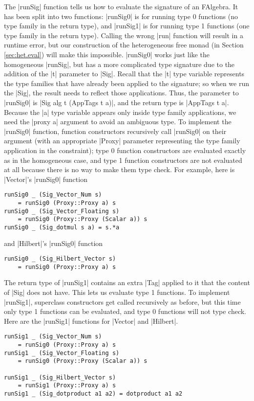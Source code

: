 \documentclass[preprint]{sigplanconf}
\theoremstyle{definition}
\begin{document}
The |runSig| function tells us how to evaluate the signature of an FAlgebra.
It has been split into two functions:
|runSig0| is for running type 0 functions (no type family in the return type),
and |runSig1| is for running type 1 functions (one type family in the return type).
Calling the wrong |run| function will result in a runtime error,
but our construction of the heterogeneous free monad (in Section \ref{sec:het.eval}) will make this impossible.
|runSig0| works just like the homogeneous |runSig|,
but has a more complicated type signature due to the addition of the |t| parameter to |Sig|.
Recall that the |t| type variable represents the type families that have already been applied to the signature;
so when we run the |Sig|, the result needs to reflect those applications.
Thus, the parameter to |runSig0| is |Sig alg t (AppTags t a)|,
and the return type is |AppTags t a|.
Because the |a| type variable appears only inside type family applications,
we need the |proxy a| argument to avoid an ambiguous type.
To implement the |runSig0| function, function constructors recursively call |runSig0| on their argument (with an appropriate |Proxy| parameter representing the type family application in the constraint);
type 0 function constructors are evaluated exactly as in the homogeneous case,
and type 1 function constructors are not evaluated at all because there is no way to make them type check.
For example, here is |Vector|'s |runSig0| function
\begin{lstlisting}
runSig0 _ (Sig_Vector_Num s)
    = runSig0 (Proxy::Proxy a) s
runSig0 _ (Sig_Vector_Floating s)
    = runSig0 (Proxy::Proxy (Scalar a)) s
runSig0 _ (Sig_dotmul s a) = s.*a
\end{lstlisting}
and |Hilbert|'s |runSig0| function
\begin{lstlisting}
runSig0 _ (Sig_Hilbert_Vector s)
    = runSig0 (Proxy::Proxy a) s
\end{lstlisting}
The return type of |runSig1| contains an extra |Tag| applied to it that the content of |Sig| does not have.
This lets us evaluate type 1 functions.
To implement |runSig1|, superclass constructors get called recursively as before,
but this time only type 1 functions can be evaluated,
and type 0 functions will not type check.
Here are the |runSig1| functions for |Vector| and |Hilbert|.
\begin{lstlisting}
runSig1 _ (Sig_Vector_Num s)
    = runSig0 (Proxy::Proxy a) s
runSig1 _ (Sig_Vector_Floating s)
    = runSig0 (Proxy::Proxy (Scalar a)) s

runSig1 _ (Sig_Hilbert_Vector s)
    = runSig1 (Proxy::Proxy a) s
runSig1 _ (Sig_dotproduct a1 a2) = dotproduct a1 a2
\end{lstlisting}
\end{document}
